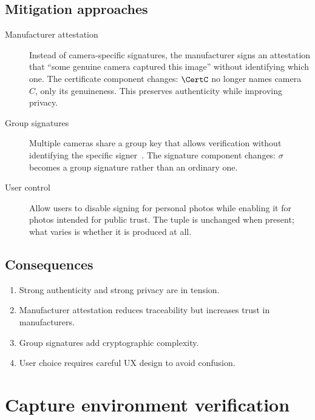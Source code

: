 \subsection{Mitigation approaches}

\begin{description}
  \item[Manufacturer attestation] Instead of camera-specific signatures,
    the manufacturer signs an attestation that \enquote{some genuine
    camera captured this image} without identifying which one.
    The certificate component changes: \(\CertC\) no longer names
    camera~\(C\), only its genuineness.
    This preserves authenticity while improving privacy.
  \item[Group signatures] Multiple cameras share a group key that allows
    verification without identifying the specific
    signer~\autocite{ChaumvanHeyst1991}.
    The signature component changes: \(\sigma\) becomes a group signature
    rather than an ordinary one.
  \item[User control] Allow users to disable signing for personal photos
    while enabling it for photos intended for public trust.
    The tuple is unchanged when present; what varies is whether it is
    produced at all.
\end{description}

\subsection{Consequences}

\begin{enumerate}
  \item Strong authenticity and strong privacy are in tension.
  \item Manufacturer attestation reduces traceability but increases
    trust in manufacturers.
  \item Group signatures add cryptographic complexity.
  \item User choice requires careful UX design to avoid confusion.
\end{enumerate}


\section{Capture environment verification}\label{CameraCaptureEnvironment}


